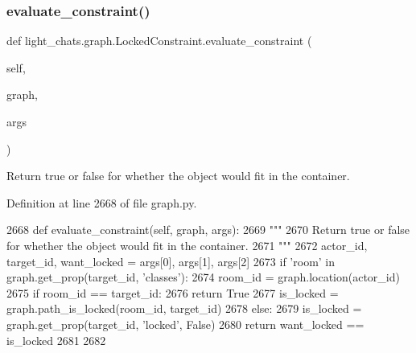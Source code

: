 \subsubsection{\texorpdfstring{evaluate\+\_\+constraint()}{evaluate\_constraint()}}
{\footnotesize\ttfamily def light\+\_\+chats.\+graph.\+Locked\+Constraint.\+evaluate\+\_\+constraint (\begin{DoxyParamCaption}\item[{}]{self,  }\item[{}]{graph,  }\item[{}]{args }\end{DoxyParamCaption})}

\begin{DoxyVerb}Return true or false for whether the object would fit in the container.
\end{DoxyVerb}
 

Definition at line 2668 of file graph.\+py.


\begin{DoxyCode}
2668     \textcolor{keyword}{def }evaluate\_constraint(self, graph, args):
2669         \textcolor{stringliteral}{"""}
2670 \textcolor{stringliteral}{        Return true or false for whether the object would fit in the container.}
2671 \textcolor{stringliteral}{        """}
2672         actor\_id, target\_id, want\_locked = args[0], args[1], args[2]
2673         \textcolor{keywordflow}{if} \textcolor{stringliteral}{'room'} \textcolor{keywordflow}{in} graph.get\_prop(target\_id, \textcolor{stringliteral}{'classes'}):
2674             room\_id = graph.location(actor\_id)
2675             \textcolor{keywordflow}{if} room\_id == target\_id:
2676                 \textcolor{keywordflow}{return} \textcolor{keyword}{True}
2677             is\_locked = graph.path\_is\_locked(room\_id, target\_id)
2678         \textcolor{keywordflow}{else}:
2679             is\_locked = graph.get\_prop(target\_id, \textcolor{stringliteral}{'locked'}, \textcolor{keyword}{False})
2680         \textcolor{keywordflow}{return} want\_locked == is\_locked
2681 
2682 
\end{DoxyCode}
\mbox{\label{classlight__chats_1_1graph_1_1LockedConstraint_aa0d083e42d50cfb65cde341edac6f32e}} 
